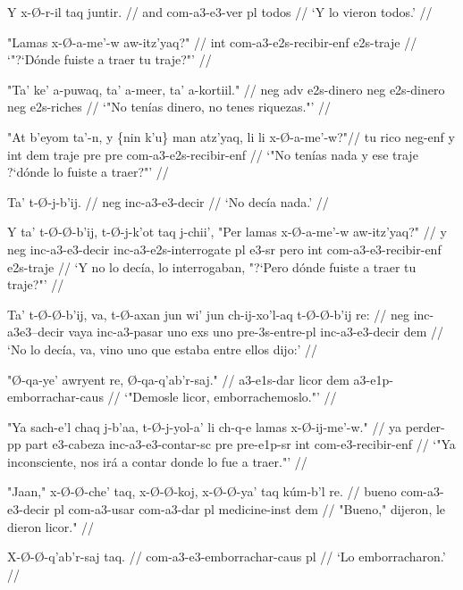 \documentclass[12pt]{article}
\begin{document}
\ex
\begingl
  \gla  Y x-\O-r-il taq juntir. //
  \glb  and com-a3-e3-ver pl todos //
  \glft `Y lo vieron todos.' //
\endgl
\xe

\ex
\begingl
  \gla "Lamas x-\O-a-me'-w aw-itz'yaq?" //
  \glb  int com-a3-e2s-recibir-enf e2s-traje //
  \glft `"?`D\'onde fuiste a traer tu traje?"' //
\endgl
\xe

\ex
\begingl
  \gla  "Ta' ke' a-puwaq, ta' a-meer, ta' a-kortiil." //
  \glb  neg adv e2s-dinero neg e2s-dinero neg e2s-riches  //
  \glft `"No ten\'ias dinero, no tenes riquezas."' //
\endgl
\xe



\ex
\begingl
  \gla  "At b'eyom ta'-n, y \{nin k'u\} man atz'yaq, li li x-\O-a-me'-w?"//
  \glb tu rico neg-enf y int dem traje pre pre com-a3-e2s-recibir-enf //
  \glft `"No ten\'ias nada y ese traje ?`d\'onde lo fuiste a traer?"' //
\endgl
\xe

\ex
\begingl
  \gla  Ta' t-\O-j-b'ij. //
  \glb neg inc-a3-e3-decir //
  \glft `No dec\'ia nada.' //
\endgl
\xe


\ex
\begingl
  \gla  Y ta' t-\O-\O-b'ij, t-\O-j-k'ot taq j-chii', "Per lamas x-\O-a-me'-w aw-itz'yaq?" //
  \glb  y neg inc-a3-e3-decir inc-a3-e2s-interrogate pl e3-sr pero int com-a3-e3-recibir-enf e2s-traje //
  \glft `Y no lo dec\'ia, lo interrogaban, "?`Pero d\'onde fuiste a traer tu traje?"' //
\endgl
\xe

\ex
\begingl
  \gla Ta' t-\O-\O-b'ij, va, t-\O-axan jun wi' jun ch-ij-xo'l-aq t-\O-\O-b'ij re: //
  \glb neg inc-a3e3--decir vaya inc-a3-pasar uno exs uno pre-3s-entre-pl inc-a3-e3-decir dem //
  \glft `No lo dec\'ia, va, vino uno que estaba entre ellos dijo:' //
\endgl
\xe

\ex
\begingl
  \gla  "\O-qa-ye' awryent re, \O-qa-q'ab'r-saj." //
  \glb  a3-e1s-dar licor dem a3-e1p-emborrachar-caus //
  \glft `"Demosle licor, emborrachemoslo."' //
\endgl
\xe

\ex
\begingl
  \gla  "Ya sach-e'l chaq j-b'aa, t-\O-j-yol-a' li ch-q-e lamas x-\O-ij-me'-w." //
  \glb  ya perder-pp part e3-cabeza inc-a3-e3-contar-sc pre pre-e1p-sr int com-e3-recibir-enf //
  \glft `"Ya inconsciente, nos ir\'a a contar donde lo fue a traer."' //
\endgl
\xe

\ex
\begingl
  \gla  "Jaan," x-\O-\O-che' taq, x-\O-\O-koj, x-\O-\O-ya' taq k\'um-b'l re. //
  \glb bueno com-a3-e3-decir pl com-a3-usar com-a3-dar pl medicine-inst dem  //
  \glft "Bueno," dijeron, le dieron licor." //
\endgl
\xe

\ex
\begingl
  \gla  X-\O-\O-q'ab'r-saj taq. //
  \glb com-a3-e3-emborrachar-caus pl  //
  \glft `Lo emborracharon.' //
\endgl
\xe
\end{document}
